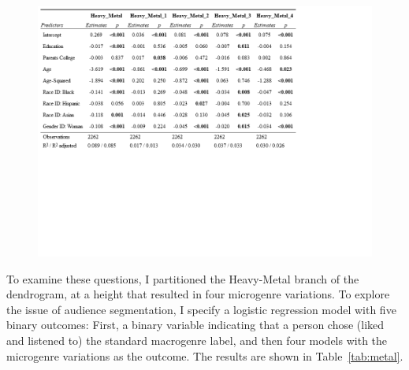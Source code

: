\documentclass[a4paper,12pt]{extarticle}
\begin{document}
\begin{figure}[ht!]
    \centering    \includegraphics[width=1.0\textwidth]{Tabs/reg-tab-metal.png}
    \caption{}
    \label{tab:reg-metal}
\end{figure}
    
To examine these questions, I partitioned the Heavy-Metal branch of the dendrogram, at a height that resulted in four microgenre variations. To explore the issue of audience segmentation, I specify a logistic regression model with five binary outcomes: First, a binary variable indicating that a person chose (liked and listened to) the standard macrogenre label, and then four models with the microgenre variations as the outcome. The results are shown in Table~\ref{tab:metal}.
\end{document}
